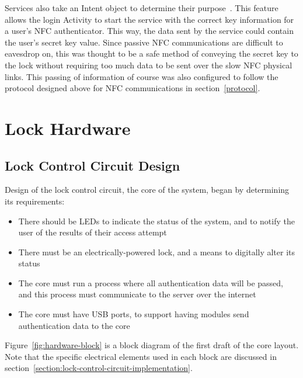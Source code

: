 \documentclass[12pt]{report}
\let\Oldsection\section
\renewcommand{\section}{\FloatBarrier\Oldsection}
\let\Oldsubsection\subsection
\renewcommand{\subsection}{\FloatBarrier\Oldsubsection}
\begin{document}
Services also take an Intent object to determine their purpose~\autocite{ANDROIDINTENT}. This feature allows the login Activity to start
the service with the correct key information for a user's NFC authenticator. This way, the data sent by the service could
contain the user's secret key value. Since passive NFC communications are difficult to eavesdrop on, this was thought to be
a safe method of conveying the secret key to the lock without requiring too much data to be sent over the slow NFC
physical links. This passing of information of course was also configured to follow the protocol designed above for NFC
communications in section~\ref{protocol}.


\section{Lock Hardware} \label{lock-hardware}


\subsection{Lock Control Circuit Design} \label{lock-control-circuit-design}

Design of the lock control circuit, the core of the system, began by determining its requirements:
\begin{itemize}
    \item There should be LEDs to indicate the status of the system, and to notify the user of the results of their 
    access attempt
    \item There must be an electrically-powered lock, and a means to digitally alter its status
    \item The core must run a process where all authentication data will be passed, and this process must communicate 
    to the server over the internet
    \item The core must have USB ports, to support having modules send authentication data to the core
\end{itemize}

Figure~\ref{fig:hardware-block} is a block diagram of the first draft of the core layout. Note that the specific 
electrical elements used in each block are discussed in section~\ref{section:lock-control-circuit-implementation}.
\end{document}
